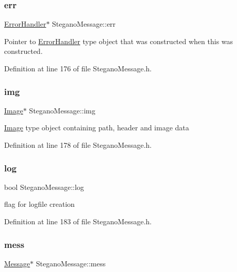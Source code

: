 \subsubsection{\texorpdfstring{err}{err}}
{\footnotesize\ttfamily \mbox{\hyperlink{classErrorHandler}{Error\+Handler}}$\ast$ Stegano\+Message\+::err\hspace{0.3cm}{\ttfamily [private]}}

Pointer to \mbox{\hyperlink{classErrorHandler}{Error\+Handler}} type object that was constructed when this was constructed. 

Definition at line 176 of file Stegano\+Message.\+h.

\mbox{\label{classSteganoMessage_acd7dba217d5df515d93ddf814734ecf4}} 
\subsubsection{\texorpdfstring{img}{img}}
{\footnotesize\ttfamily \mbox{\hyperlink{classImage}{Image}}$\ast$ Stegano\+Message\+::img\hspace{0.3cm}{\ttfamily [private]}}

\mbox{\hyperlink{classImage}{Image}} type object containing path, header and image data 

Definition at line 178 of file Stegano\+Message.\+h.

\mbox{\label{classSteganoMessage_a687c455d3f09eb5349e0358cb07aa21c}} 
\subsubsection{\texorpdfstring{log}{log}}
{\footnotesize\ttfamily bool Stegano\+Message\+::log\hspace{0.3cm}{\ttfamily [private]}}

flag for logfile creation 

Definition at line 183 of file Stegano\+Message.\+h.

\mbox{\label{classSteganoMessage_a64f70bbacb0662cebe764316658da35d}} 
\subsubsection{\texorpdfstring{mess}{mess}}
{\footnotesize\ttfamily \mbox{\hyperlink{classMessage}{Message}}$\ast$ Stegano\+Message\+::mess\hspace{0.3cm}{\ttfamily [private]}}


